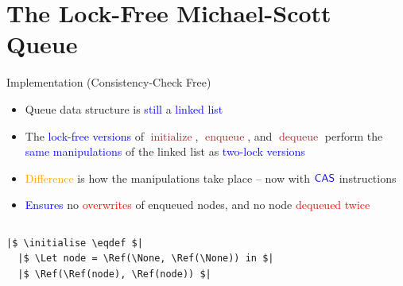 \documentclass[9pt,xcolor={dvipsnames}]{beamer}
\newcommand{\initialise}{\operatorname{initialize}}
\newcommand{\enqueue}{\operatorname{enqueue}}
\newcommand{\dequeue}{\operatorname{dequeue}}
\begin{document}

\section{The Lock-Free Michael-Scott Queue}

\begin{frame}[fragile]{Implementation (Consistency-Check Free)}
  \begin{itemize}
    \item Queue data structure is \textcolor{blue}{still} a \textcolor{blue}{linked list}
    \item The \textcolor{blue}{lock-free versions} of \textcolor{Brown}{$\initialise$}, \textcolor{Brown}{$\enqueue$}, and \textcolor{Brown}{$\dequeue$} perform the \textcolor{blue}{same manipulations} of the linked list as \textcolor{blue}{two-lock versions}
    \item \textcolor{orange}{Difference} is how the manipulations take place \pause -- now with $\textsf{\color{blue} CAS}$ instructions
    \item \textcolor{blue}{Ensures} no \textcolor{red}{overwrites} of enqueued nodes, and no node \textcolor{red}{dequeued twice}
  \end{itemize}
  \vspace{-12pt}
  \begin{columns}[t]
    \begin{column}{0.5\textwidth}
      \begin{verbatim}
|$ \initialise \eqdef $|
  |$ \Let node = \Ref(\None, \Ref(\None)) in $|
  |$ \Ref(\Ref(node), \Ref(node)) $|


\end{verbatim}
\end{column}
\end{columns}
\end{frame}
\end{document}
